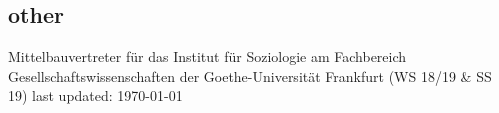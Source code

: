 \documentclass[11pt, a4paper]{article}
\newcommand{\years}[1]{\marginnote{~~#1}}
\begin{document}
\subsection*{other}
Mittelbauvertreter für das Institut für Soziologie am Fachbereich Gesellschaftswissenschaften der Goethe-Universität Frankfurt (WS 18/19 \& SS 19)
\vfill{}
last updated: \today
\end{document}
